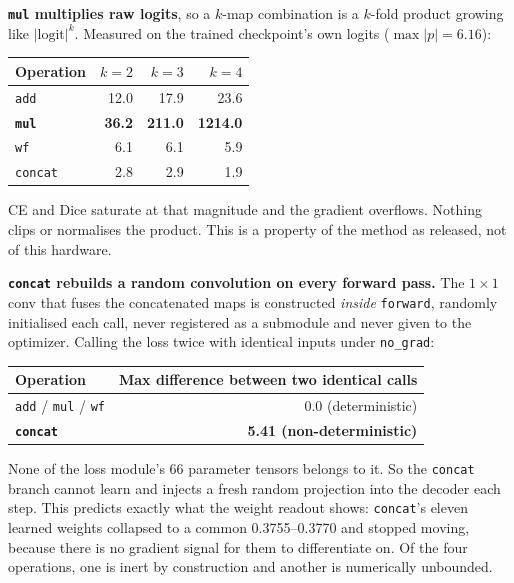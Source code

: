 \documentclass[11pt,a4paper]{article}
\newcommand{\code}[1]{\texttt{\small #1}}
\begin{document}
\textbf{\code{mul} multiplies raw logits}, so a $k$-map combination is a
$k$-fold product growing like $|\text{logit}|^k$. Measured on the trained
checkpoint's own logits ($\max |p| = 6.16$):

\begin{center}
\begin{tabular}{@{}lrrr@{}}
\toprule
\textbf{Operation} & $k=2$ & $k=3$ & $k=4$ \\
\midrule
\code{add} & 12.0 & 17.9 & 23.6 \\
\textbf{\code{mul}} & \textbf{36.2} & \textbf{211.0} & \textbf{1214.0} \\
\code{wf} & 6.1 & 6.1 & 5.9 \\
\code{concat} & 2.8 & 2.9 & 1.9 \\
\bottomrule
\end{tabular}
\end{center}

CE and Dice saturate at that magnitude and the gradient overflows. Nothing clips
or normalises the product. This is a property of the method as released, not of
this hardware.

\textbf{\code{concat} rebuilds a random convolution on every forward pass.} The
$1\times1$ conv that fuses the concatenated maps is constructed \emph{inside}
\code{forward}, randomly initialised each call, never registered as a submodule
and never given to the optimizer. Calling the loss twice with identical inputs
under \code{no\_grad}:

\begin{center}
\begin{tabular}{@{}lr@{}}
\toprule
\textbf{Operation} & \textbf{Max difference between two identical calls} \\
\midrule
\code{add} / \code{mul} / \code{wf} & 0.0 (deterministic) \\
\textbf{\code{concat}} & \textbf{5.41 (non-deterministic)} \\
\bottomrule
\end{tabular}
\end{center}

None of the loss module's 66 parameter tensors belongs to it. So the
\code{concat} branch cannot learn and injects a fresh random projection into the
decoder each step. This predicts exactly what the weight readout shows:
\code{concat}'s eleven learned weights collapsed to a common 0.3755--0.3770 and
stopped moving, because there is no gradient signal for them to differentiate
on. Of the four operations, one is inert by construction and another is
numerically unbounded.
\end{document}
